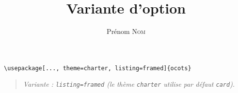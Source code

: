 \documentclass[11pt]{ocots-book}
\title{Variante d'option}
\author{Prénom \textsc{Nom}}
\newcommand{\ocotsvariantnote}[1]{\begin{quote}\itshape Variante : #1\end{quote}}
\begin{document}
\maketitle

\begin{lstlisting}
\usepackage[..., theme=charter, listing=framed]{ocots}
\end{lstlisting}
\ocotsvariantnote{\texttt{listing=framed} (le th\`eme \texttt{charter} utilise par d\'efaut \texttt{card}).}

\end{document}
